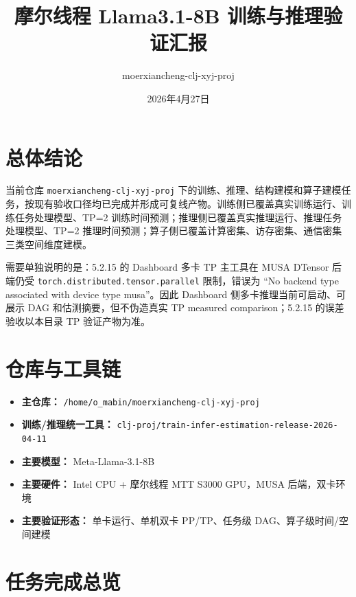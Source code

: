 \documentclass[UTF8,a4paper,11pt]{ctexart}
\title{摩尔线程 Llama3.1-8B 训练与推理验证汇报}
\author{moerxiancheng-clj-xyj-proj}
\date{2026年4月27日}
\begin{document}
\maketitle

\section{总体结论}

当前仓库 \texttt{moerxiancheng-clj-xyj-proj} 下的训练、推理、结构建模和算子建模任务，按现有验收口径均已完成并形成可复线产物。训练侧已覆盖真实训练运行、训练任务处理模型、TP=2 训练时间预测；推理侧已覆盖真实推理运行、推理任务处理模型、TP=2 推理时间预测；算子侧已覆盖计算密集、访存密集、通信密集三类空间维度建模。

需要单独说明的是：5.2.15 的 Dashboard 多卡 TP 主工具在 MUSA DTensor 后端仍受 \texttt{torch.distributed.tensor.parallel} 限制，错误为 ``No backend type associated with device type musa''。因此 Dashboard 侧多卡推理当前可启动、可展示 DAG 和估测摘要，但不伪造真实 TP measured comparison；5.2.15 的误差验收以本目录 TP 验证产物为准。

\section{仓库与工具链}

\begin{itemize}
  \item \textbf{主仓库：} \texttt{/home/o\_mabin/moerxiancheng-clj-xyj-proj}
  \item \textbf{训练/推理统一工具：} \texttt{clj-proj/train-infer-estimation-release-2026-04-11}
  \item \textbf{主要模型：} Meta-Llama-3.1-8B
  \item \textbf{主要硬件：} Intel CPU + 摩尔线程 MTT S3000 GPU，MUSA 后端，双卡环境
  \item \textbf{主要验证形态：} 单卡运行、单机双卡 PP/TP、任务级 DAG、算子级时间/空间建模
\end{itemize}

\section{任务完成总览}
\end{document}
